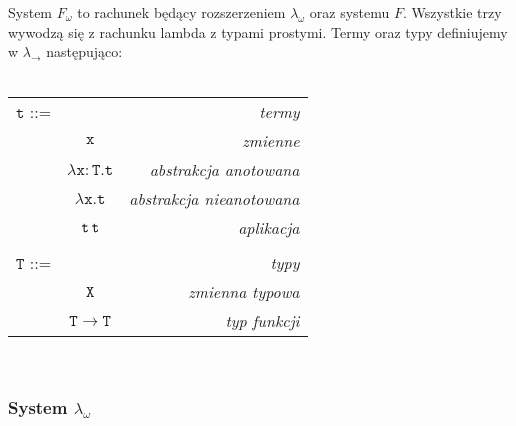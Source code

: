\documentclass[11pt,leqno]{article}
\begin{document}
System $F_{\omega}$ to rachunek będący rozszerzeniem $\lambda_{\omega}$ oraz systemu $F$.
Wszystkie trzy wywodzą się z rachunku lambda z typami prostymi. Termy oraz typy definiujemy w $\lambda_{\rightarrow}$ następująco: \\ \\
\begin{tabular}{| l c r |}
  \hline
  $\mathtt{t}$ ::= &  & \textit{termy}  \\
   & $\mathtt{x}$ & \textit{zmienne}  \\
   & $\mathtt{\lambda x:T.t}$ & \textit{abstrakcja anotowana} \\
   & $\mathtt{\lambda x.t}$ & \textit{abstrakcja nieanotowana} \\
   & $\mathtt{t \hspace{0.2em} t}$ & \textit{aplikacja} \\
   & & \\
  $\mathtt{T}$ ::= &  & \textit{typy} \\
   & $\mathtt{X}$ & \textit{zmienna typowa} \\
   & $\mathtt{T \rightarrow T}$ & \textit{typ funkcji} \\
  \hline
\end{tabular} \\



\subsubsection{System $\lambda_{\omega}$} 
\end{document}
